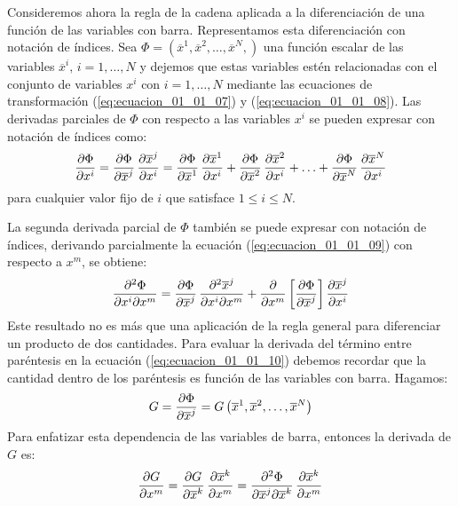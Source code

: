 \documentclass[hidelinks,12pt]{article}
\begin{document}
Consideremos ahora la regla de la cadena aplicada a la diferenciación de una función de las variables con barra. Representamos esta diferenciación con notación de índices. Sea $\Phi = \left( \overline{x}^{1},  \overline{x}^{2}, \ldots, \overline{x}^{N}, \right)$ una función escalar de las variables $\overline{x}^{i}, \, i = 1, \ldots, N$ y dejemos que estas variables estén relacionadas con el conjunto de variables $x^{i}$  con $i = 1, \ldots, N$ mediante las ecuaciones de transformación (\ref{eq:ecuacion_01_01_07}) y (\ref{eq:ecuacion_01_01_08}). Las derivadas parciales de $\Phi$ con respecto a las variables $x^{i}$ se pueden expresar con notación de índices como:
\begin{align}
\pdv{\Phi}{x^{i}} = \pdv{\Phi}{\overline{x}^{j}} \, \pdv{\overline{x}^{j}}{x^i} = \pdv{\Phi}{\overline{x}^{1}} \, \pdv{\overline{x}^{1}}{x^{i}} + \pdv{\Phi}{\overline{x}^{2}} \, \pdv{\overline{x}^{2}}{x^{i}} + \ldots + \pdv{\Phi}{\overline{x}^{N}} \, \pdv{\overline{x}^{N}}{x^{i}}
\label{eq:ecuacion_01_01_09}
\end{align}
para cualquier valor fijo de $i$ que satisface $1 \leq i \leq N$.
\par
La segunda derivada parcial de $\Phi$ también se puede expresar con notación de índices, derivando parcialmente la ecuación (\ref{eq:ecuacion_01_01_09}) con respecto a $x^{m}$, se obtiene:
\begin{align}
\pdv[2]{\Phi}{x^{i}}{x^{m}} = \pdv{\Phi}{\overline{x}^{j}} \, \pdv[2]{\overline{x}^{j}}{x^{i}}{x^{m}} + \pdv{x^{m}} \left[ \pdv{\Phi}{\overline{x}^{j}} \right] \pdv{\overline{x}^{j}}{x^{i}}
\label{eq:ecuacion_01_01_10}
\end{align}
Este resultado no es más que una aplicación de la regla general para diferenciar un producto de dos cantidades. Para evaluar la derivada del término entre paréntesis en la ecuación (\ref{eq:ecuacion_01_01_10}) debemos recordar que la cantidad dentro de los paréntesis es función de las variables con barra. Hagamos:
\begin{align*}
G = \pdv{\Phi}{\overline{x}^{j}} = G \left( \overline{x}^{1}, \overline{x}^{2}, \ldots, \overline{x}^{N} \right)
\end{align*}
Para enfatizar esta dependencia de las variables de barra, entonces la derivada de $G$ es:
\begin{align}
\pdv{G}{x^{m}} = \pdv{G}{\overline{x}^{k}} \, \pdv{\overline{x}^{k}}{x^{m}} = \pdv[2]{\Phi}{\overline{x}^{j}}{\overline{x}^{k}} \, \pdv{\overline{x}^{k}}{x^{m}}
\label{eq:ecuacion_01_01_11}
\end{align}
\end{document}
